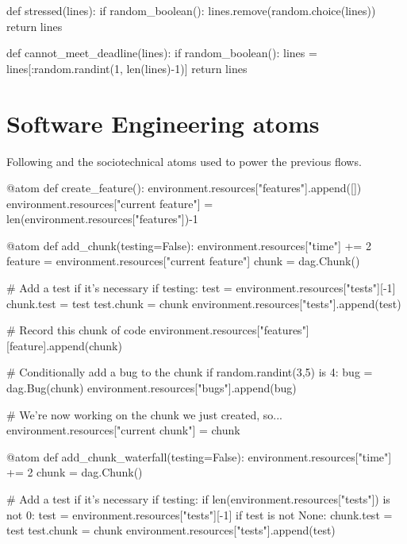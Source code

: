 \begin{appendices}
\begin{pyglist}[language = python, caption={Mutator functions used in experiments}, listingname=\textbf{Code Listing} \comment{, fvset={frame=single,framerule=1pt}}, numbers=left]
def stressed(lines):
    if random_boolean():
        lines.remove(random.choice(lines))
    return lines


def cannot_meet_deadline(lines):
    if random_boolean():
        lines = lines[:random.randint(1, len(lines)-1)]
    return lines
\end{pyglist}

\chapter{Software Engineering atoms}
\label{appendix:atoms}
Following and the sociotechnical atoms used to power the previous flows.

\begin{pyglist}[language = python, caption={Atoms used in experiments}, listingname=\textbf{Code Listing} \comment{, fvset={frame=single,framerule=1pt}}, numbers=left]

@atom
def create_feature():
    environment.resources["features"].append([])
    environment.resources["current feature"] = len(environment.resources["features"])-1


@atom
def add_chunk(testing=False):
    environment.resources["time"] += 2
    feature = environment.resources["current feature"]
    chunk = dag.Chunk()

    # Add a test if it's necessary
    if testing:
        test = environment.resources["tests"][-1]
        chunk.test = test
        test.chunk = chunk
        environment.resources["tests"].append(test)

    # Record this chunk of code
    environment.resources["features"][feature].append(chunk)

    # Conditionally add a bug to the chunk
    if random.randint(3,5) is 4:
        bug = dag.Bug(chunk)
        environment.resources["bugs"].append(bug)

    # We're now working on the chunk we just created, so...
    environment.resources["current chunk"] = chunk


@atom
def add_chunk_waterfall(testing=False):
    environment.resources["time"] += 2
    chunk = dag.Chunk()

    # Add a test if it's necessary
    if testing:
        if len(environment.resources["tests"]) is not 0:
            test = environment.resources["tests"][-1]
            if test is not None:
                chunk.test = test
                test.chunk = chunk
                environment.resources["tests"].append(test)


\end{pyglist}
\end{appendices}
